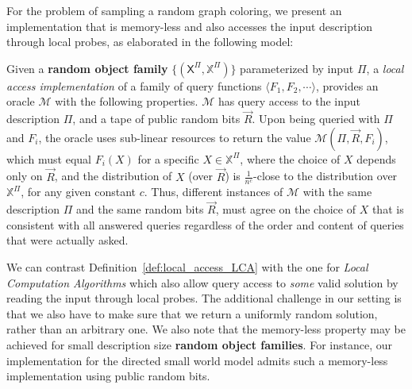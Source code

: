 
For the problem of sampling a random graph coloring,
we present an implementation that is memory-less and also accesses the input description through local probes,
as elaborated in the following model:

\begin{definition}
\label{def:local_access_LCA}
Given a \textbf{random object family} $\{(\mathsf X^{\Pi}, \mathbb X^{\Pi})\}$ parameterized by input $\Pi$,
a \emph{local access implementation} of a family of query functions $\langle F_1, F_2,\cdots \rangle$,
provides an oracle $\mathcal M$ with the following properties.
$\mathcal M$ has query access to the input description $\Pi$, and a tape of public random bits $\vec R$.
Upon being queried with $\Pi$ and $F_i$, the oracle uses sub-linear resources to return the value $\mathcal M(\Pi,\vec R,F_i)$,
which must equal $F_i(X)$ for a specific $X\in\mathbb X^{\Pi}$, where the choice of $X$ depends only on $\vec R$,
and the distribution of $X$ (over $\vec R$) is $\frac1{n^c}$-close to the distribution over $\mathbb X^{\Pi}$, for any given constant $c$.
Thus, different instances of $\mathcal M$ with the same description $\Pi$ and the same random bits $\vec R$,
must agree on the choice of $X$ that is consistent with all answered queries regardless of the order and content of queries that were actually asked.
\end{definition}

We can contrast Definition~\ref{def:local_access_LCA} with the one for \emph{Local Computation Algorithms} \cite{LCA, LCA_space_efficient}
which also allow query access to \emph{some} valid solution by reading the input through local probes.
The additional challenge in our setting is that we also have to make sure that we return a uniformly random solution, rather than an arbitrary one.
We also note that the memory-less property may be achieved for small description size \textbf{random object families}.
For instance, our implementation for the directed small world model admits such a memory-less implementation using public random bits.



